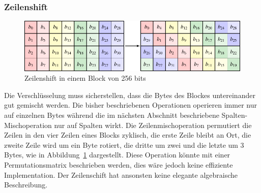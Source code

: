 \subsubsection{Zeilenshift}
\begin{figure}
\centering
\includegraphics[width=\textwidth]{chapters/90-crypto/images/shift.pdf}
\caption{Zeilenshift in einem Block von 256 bits
\label{buch:crypto:fig:shift}}
\end{figure}
Die Verschlüsselung muss sicherstellen, dass die Bytes des Blockes
untereinander gut gemischt werden.
Die bisher beschriebenen Operationen operieren immer nur auf einzelnen
Bytes während
die im nächsten Abschnitt beschriebene Spalten-Mischoperation
nur auf Spalten wirkt.
Die Zeilen\-misch\-ope\-ra\-tion permutiert die Zeilen in den vier Zeilen
eines Blocks zyklisch, die erste Zeile bleibt an Ort, die zweite
Zeile wird um ein Byte rotiert, die dritte um zwei und die letzte
um 3 Bytes, wie in Abbildung~\ref{buch:crypto:fig:shift}
dargestellt.
Diese Operation könnte mit einer Permutationsmatrix beschrieben werden,
dies wäre jedoch keine effiziente Implementation.
Der Zeilenschift hat ansonsten keine elegante algebraische Beschreibung.

